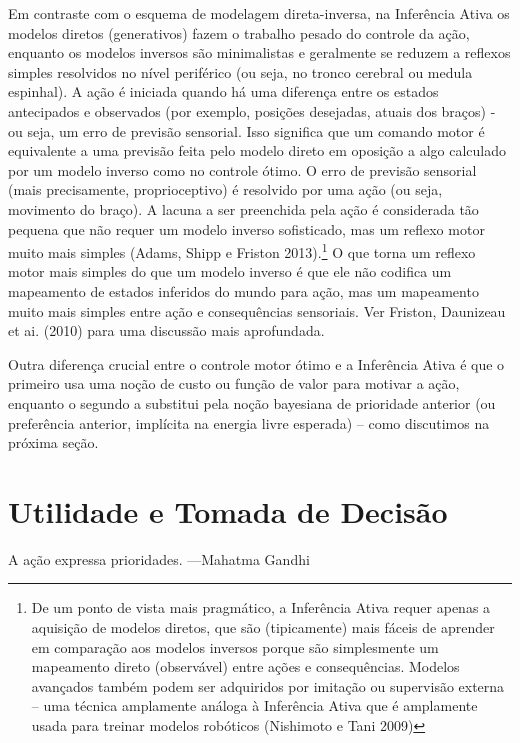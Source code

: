 \documentclass[
  12pt,
]{book}
\begin{document}
Em contraste com o esquema de modelagem direta-inversa, na Inferência Ativa os modelos diretos (generativos) fazem o trabalho pesado do controle da ação, enquanto os modelos inversos são minimalistas e geralmente se reduzem a reflexos simples resolvidos no nível periférico (ou seja, no tronco cerebral ou medula espinhal). A ação é iniciada quando há uma diferença entre os estados antecipados e observados (por exemplo, posições desejadas, atuais dos braços) - ou seja, um erro de previsão sensorial. Isso significa que um comando motor é equivalente a uma previsão feita pelo modelo direto em oposição a algo calculado por um modelo inverso como no controle ótimo. O erro de previsão sensorial (mais precisamente, proprioceptivo) é resolvido por uma ação (ou seja, movimento do braço). A lacuna a ser preenchida pela ação é considerada tão pequena que não requer um modelo inverso sofisticado, mas um reflexo motor muito mais simples (Adams, Shipp e Friston 2013).\footnote{De um ponto de vista mais pragmático, a Inferência Ativa requer apenas a aquisição de modelos diretos, que são (tipicamente) mais fáceis de aprender em comparação aos modelos inversos porque são simplesmente um mapeamento direto (observável) entre ações e consequências. Modelos avançados também podem ser adquiridos por imitação ou supervisão externa -- uma técnica amplamente análoga à Inferência Ativa que é amplamente usada para treinar modelos robóticos (Nishimoto e Tani 2009)} O que torna um reflexo motor mais simples do que um modelo inverso é que ele não codifica um mapeamento de estados inferidos do mundo para ação, mas um mapeamento muito mais simples entre ação e consequências sensoriais. Ver Friston, Daunizeau et ai. (2010) para uma discussão mais aprofundada.

Outra diferença crucial entre o controle motor ótimo e a Inferência Ativa é que o primeiro usa uma noção de custo ou função de valor para motivar a ação, enquanto o segundo a substitui pela noção bayesiana de prioridade anterior (ou preferência anterior, implícita na energia livre esperada) -- como discutimos na próxima seção.

\hypertarget{utilidade-e-tomada-de-decisuxe3o}{%
\section{Utilidade e Tomada de Decisão}\label{utilidade-e-tomada-de-decisuxe3o}}

A ação expressa prioridades. ---Mahatma Gandhi
\end{document}
